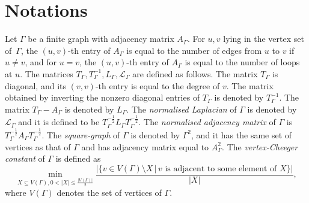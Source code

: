 \documentclass[ALCO,Unicode,published]{cedram}
\newcommand{\mo}{{-1}}
\newcommand{\calL}{\ensuremath{\mathcal{L}}}
\begin{document}
\section{Notations}
Let $\Gamma$ be a finite graph with adjacency matrix $A_\Gamma$. 
For $u, v$ lying in the vertex set of~$\Gamma$, the $(u,v)$-th entry of $A_\Gamma$ is equal to the number of edges from $u$ to $v$ if $u\neq v$, and  for $u = v$, the $(u,v)$-th entry of $A_\Gamma$ is equal to the number of loops at $u$. The matrices $T_\Gamma, T_\Gamma^\mo, L_\Gamma, \calL_\Gamma$ are defined as follows. The matrix $T_\Gamma$ is diagonal, and its $(v, v)$-th entry is equal to the degree of $v$. The matrix obtained by inverting the nonzero diagonal entries of $T_\Gamma$ is denoted by $T_\Gamma^\mo$. The matrix $T_\Gamma - A_\Gamma$ is denoted by $L_\Gamma$. The \textit{normalised Laplacian} of $\Gamma$ is denoted by $\calL_\Gamma$ and it is defined to be $T_\Gamma^{-\frac 12} L_\Gamma T_\Gamma^{- \frac 12}$. The \textit{normalised adjacency matrix} of $\Gamma$ is $T_\Gamma^{-\frac 12} A_\Gamma T_\Gamma^{- \frac 12}$. The \textit{square-graph} of $\Gamma$ is denoted by $\Gamma^2$, and it has the same set of vertices as that of $\Gamma$ and has adjacency matrix equal to $A_\Gamma^2$. The \textit{vertex-Cheeger constant} of $\Gamma$ is defined as 
$$\min_{X\subseteq V(\Gamma), 0 < |X| \leq \frac{|V(\Gamma)|}2}
\frac{|\{v\in V(\Gamma) \setminus X\,|\, v \text{ is adjacent to some element of } X\}|}{|X|}
,$$
where $V(\Gamma)$ denotes the set of vertices of $\Gamma$. 
\end{document}
